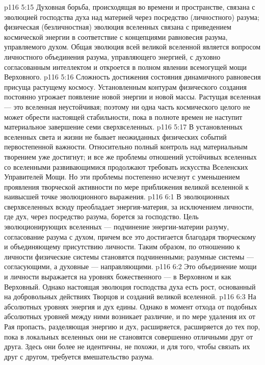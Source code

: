 \vs p116 5:15 Духовная борьба, происходящая во времени и пространстве, связана с эволюцией господства духа над материей через посредство (личностного) разума; физическая (безличностная) эволюция вселенных связана с приведением космической энергии в соответствие с концепциями равновесия разума, управляемого духом. Общая эволюция всей великой вселенной является вопросом личностного объединения разума, управляющего энергией, с духовно согласованным интеллектом и откроется в полном явлении всемогущей мощи Верховного.
\vs p116 5:16 Сложность достижения состояния динамичного равновесия присуща растущему космосу. Установленным контурам физического создания постоянно угрожает появление новой энергии и новой массы. Растущая вселенная --- это вселенная неустойчивая; поэтому ни одна часть космического целого не может обрести настоящей стабильности, пока в полноте времен не наступит материальное завершение семи сверхвселенных.
\vs p116 5:17 В установленных вселенных света и жизни не бывает неожиданных физических событий первостепенной важности. Относительно полный контроль над материальным творением уже достигнут; и все же проблемы отношений устойчивых вселенных со вселенными развивающимися продолжают требовать искусства Вселенских Управителей Мощи. Но эти проблемы постепенно исчезнут с уменьшением проявления творческой активности по мере приближения великой вселенной к наивысшей точке эволюционного выражения.
\vs p116 6:1 В эволюционных сверхвселенных всюду преобладает энергия\hyp{}материя, за исключением личности, где дух, через посредство разума, борется за господство. Цель эволюционирующих вселенных --- подчинение энергии\hyp{}материи разуму, согласование разума с духом, причем все это достигается благодаря творческому и объединяющему присутствию личности. Таким образом, по отношению к личности физические системы становятся подчиненными; разумные системы --- согласующими, а духовные --- направляющими.
\vs p116 6:2 Это объединение мощи и личности выражается на уровнях божественного --- в Верховном и как Верховный. Однако настоящая эволюция господства духа есть рост, основанный на добровольных действиях Творцов и созданий великой вселенной.
\vs p116 6:3 \pc На абсолютных уровнях энергия и дух едины. Однако в момент отхода от подобных абсолютных уровней между ними возникает различие, и по мере удаления их от Рая пропасть, разделяющая энергию и дух, расширяется, расширяется до тех пор, пока в локальных вселенных они не становятся совершенно отличными друг от друга. Здесь они более не идентичны, не похожи, и для того, чтобы связать их друг с другом, требуется вмешательство разума.
